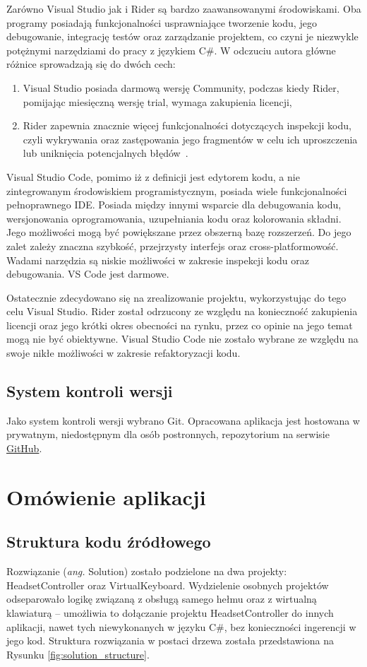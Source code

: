 \documentclass[skorowidz,skroty]{dyplomWEZUT}
\begin{document}
Zarówno Visual Studio jak i Rider są bardzo zaawansowanymi środowiskami. Oba programy posiadają funkcjonalności usprawniające tworzenie kodu, jego debugowanie, integrację testów oraz zarządzanie projektem, co czyni je niezwykle potężnymi narzędziami do pracy z językiem C\#. W odczuciu autora główne różnice sprowadzają się do dwóch cech:
\begin{enumerate}
    \item Visual Studio posiada darmową wersję Community, podczas kiedy Rider, pomijając miesięczną wersję trial, wymaga zakupienia licencji,
    \item Rider zapewnia znacznie więcej funkcjonalności dotyczących inspekcji kodu, czyli wykrywania oraz zastępowania jego fragmentów w celu ich uproszczenia lub uniknięcia potencjalnych błędów~\cite{rider}. 
\end{enumerate}

Visual Studio Code, pomimo iż z definicji jest edytorem kodu, a nie zintegrowanym środowiskiem programistycznym, posiada wiele funkcjonalności pełnoprawnego IDE. Posiada między innymi wsparcie dla debugowania kodu, wersjonowania oprogramowania, uzupełniania kodu oraz kolorowania składni. Jego możliwości mogą być powiększane przez obszerną bazę rozszerzeń. Do jego zalet zależy znaczna szybkość, przejrzysty interfejs oraz cross-platformowość. Wadami narzędzia są niskie możliwości w zakresie inspekcji kodu oraz debugowania. VS Code jest darmowe.

Ostatecznie zdecydowano się na zrealizowanie projektu, wykorzystując do tego celu Visual Studio. Rider został odrzucony ze względu na konieczność zakupienia licencji oraz jego krótki okres obecności na rynku, przez co opinie na jego temat mogą nie być obiektywne. Visual Studio Code nie zostało wybrane ze względu na swoje nikłe możliwości w zakresie refaktoryzacji kodu.

\subsection{System kontroli wersji}
Jako system kontroli wersji wybrano Git. Opracowana aplikacja jest hostowana w prywatnym, niedostępnym dla osób postronnych, repozytorium na serwisie \href{www.github.com}{GitHub}.

\section{Omówienie aplikacji}
\subsection{Struktura kodu źródłowego}
Rozwiązanie (\textit{ang.} Solution) zostało podzielone na dwa projekty: HeadsetController oraz VirtualKeyboard. Wydzielenie osobnych projektów odseparowało logikę związaną z obsługą samego hełmu oraz z wirtualną klawiaturą -- umożliwia to dołączanie projektu HeadsetController do innych aplikacji, nawet tych niewykonanych w języku C\#, bez konieczności ingerencji w jego kod. Struktura rozwiązania w postaci drzewa została przedstawiona na Rysunku \vref{fig:solution_structure}.
\end{document}
